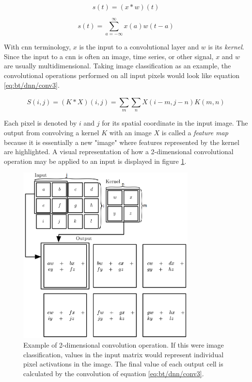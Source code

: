 \begin{equation}
    \label{eq:bt/dnn/conv1}
    s(t)=(x*w)(t)
\end{equation}

\begin{equation}
    \label{eq:bt/dnn/conv2}
    s(t)=\sum_{a=-\infty}^{\infty}x(a)w(t-a)
\end{equation}

With \acrshort{cnn} terminology, $x$ is the input to a convolutional layer and $w$ is its \textit{kernel}. Since the input to a \acrshort{cnn} is often an image, time series, or other signal, $x$ and $w$ are usually multidimensional. Taking image classification as an example, the convolutional operations performed on all input pixels would look like equation \ref{eq:bt/dnn/conv3}.

\begin{equation}
    \label{eq:bt/dnn/conv3}
    S(i,j)=(K*X)(i,j)=\sum_{m}^{}\sum_{n}^{}X(i-m,j-n)K(m,n)
\end{equation}

Each pixel is denoted by $i$ and $j$ for its spatial coordinate in the input image. The output from convolving a kernel $K$ with an image $X$ is called a \textit{feature map} because it is essentially a new "image" where features represented by the kernel are highlighted. A visual representation of how a 2-dimensional convolutional operation may be applied to an input is displayed in figure \ref{fig:bt_conv}.

\begin{figure}[h]
    \centering
    \includegraphics[width=0.8\textwidth]{figures/bt_conv.png}
    \caption{Example of 2-dimensional convolution operation. If this were image classification, values in the input matrix would represent individual pixel activations in the image. The final value of each output cell is calculated by the convolution of equation \ref{eq:bt/dnn/conv3}.}
    \label{fig:bt_conv}
\end{figure}

